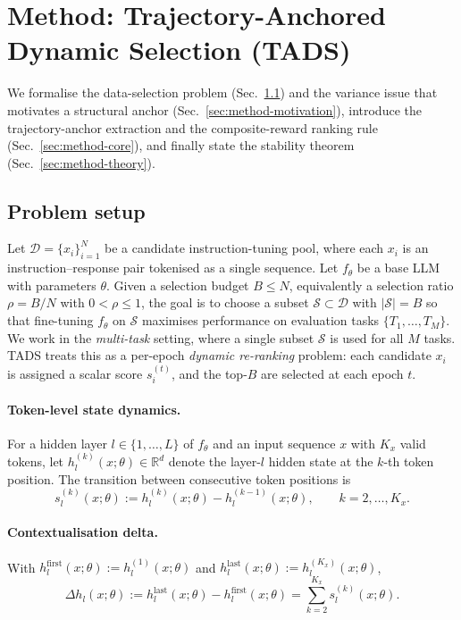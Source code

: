 \section{Method: Trajectory-Anchored Dynamic Selection (TADS)}
\label{sec:method}

We formalise the data-selection problem
(Sec.~\ref{sec:problem-setup}) and the variance issue that motivates
a structural anchor (Sec.~\ref{sec:method-motivation}), introduce
the trajectory-anchor extraction and the composite-reward ranking
rule (Sec.~\ref{sec:method-core}), and finally state the stability
theorem (Sec.~\ref{sec:method-theory}).


\subsection{Problem setup}
\label{sec:problem-setup}

Let $\mathcal{D}=\{x_i\}_{i=1}^N$ be a candidate instruction-tuning
pool, where each $x_i$ is an instruction--response pair tokenised
as a single sequence. Let $f_\theta$ be a base LLM with parameters
$\theta$. Given a selection budget $B \le N$, equivalently a
selection ratio $\rho=B/N$ with $0<\rho\le1$, the goal is to choose
a subset $\mathcal{S}\subset\mathcal{D}$ with $|\mathcal{S}|=B$ so
that fine-tuning $f_\theta$ on $\mathcal{S}$ maximises performance
on evaluation tasks $\{T_1,\ldots,T_M\}$. We work in the
\emph{multi-task} setting, where a single subset $\mathcal{S}$ is
used for all $M$ tasks. \textsc{TADS} treats this as a per-epoch
\emph{dynamic re-ranking} problem: each candidate $x_i$ is assigned
a scalar score $s_i^{(t)}$, and the top-$B$ are selected at each
epoch $t$.

\paragraph{Token-level state dynamics.}
For a hidden layer $l \in \{1,\ldots,L\}$ of $f_\theta$ and an
input sequence $x$ with $K_x$ valid tokens, let
$h_l^{(k)}(x;\theta)\in\mathbb{R}^d$ denote the layer-$l$ hidden
state at the $k$-th token position. The transition between
consecutive token positions is
\begin{equation}
  s_l^{(k)}(x;\theta) := h_l^{(k)}(x;\theta)-h_l^{(k-1)}(x;\theta),
  \qquad k=2,\ldots,K_x .
  \label{eq:transition}
\end{equation}

\paragraph{Contextualisation delta.}
With $h_l^{\mathrm{first}}(x;\theta) := h_l^{(1)}(x;\theta)$ and
$h_l^{\mathrm{last}}(x;\theta) := h_l^{(K_x)}(x;\theta)$,
\begin{equation}
  \Delta h_l(x;\theta) :=
  h_l^{\mathrm{last}}(x;\theta) - h_l^{\mathrm{first}}(x;\theta)
  = \sum_{k=2}^{K_x} s_l^{(k)}(x;\theta).
  \label{eq:delta}
\end{equation}

